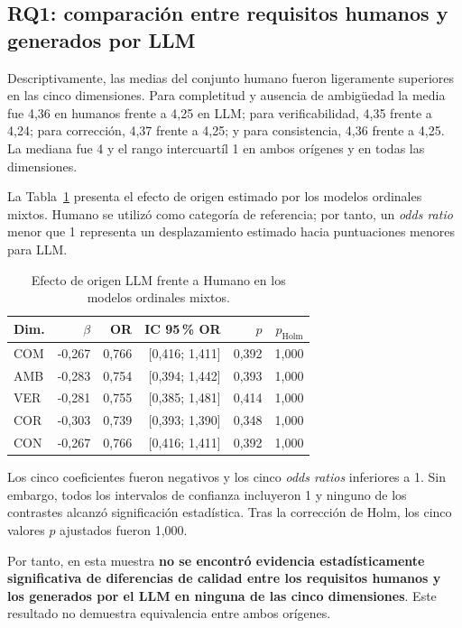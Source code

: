 \documentclass[runningheads]{llncs}
\begin{document}
\subsection{RQ1: comparaci\'on entre requisitos humanos y generados por LLM}

Descriptivamente, las medias del conjunto humano fueron ligeramente superiores en
las cinco dimensiones. Para completitud y ausencia de ambig\"uedad la media fue
4,36 en humanos frente a 4,25 en LLM; para verificabilidad, 4,35 frente a 4,24;
para correcci\'on, 4,37 frente a 4,25; y para consistencia, 4,36 frente a 4,25.
La mediana fue 4 y el rango intercuart\'il 1 en ambos or\'igenes y en todas las
dimensiones.

La Tabla~\ref{tab:rq1} presenta el efecto de origen estimado por los modelos
ordinales mixtos. Humano se utiliz\'o como categor\'ia de referencia; por tanto,
un \emph{odds ratio} menor que 1 representa un desplazamiento estimado hacia
puntuaciones menores para LLM.

\begin{table}[ht]
\centering
\caption{Efecto de origen LLM frente a Humano en los modelos ordinales mixtos.}
\label{tab:rq1}
\small
\begin{tabular}{lrrrrr}
\hline
Dim. & $\beta$ & OR & IC 95\,\% OR & $p$ & $p_{\mathrm{Holm}}$ \\
\hline
COM & -0,267 & 0,766 & [0,416; 1,411] & 0,392 & 1,000 \\
AMB & -0,283 & 0,754 & [0,394; 1,442] & 0,393 & 1,000 \\
VER & -0,281 & 0,755 & [0,385; 1,481] & 0,414 & 1,000 \\
COR & -0,303 & 0,739 & [0,393; 1,390] & 0,348 & 1,000 \\
CON & -0,267 & 0,766 & [0,416; 1,411] & 0,392 & 1,000 \\
\hline
\end{tabular}
\end{table}

Los cinco coeficientes fueron negativos y los cinco \emph{odds ratios} inferiores
a 1. Sin embargo, todos los intervalos de confianza incluyeron 1 y ninguno de los
contrastes alcanz\'o significaci\'on estad\'istica. Tras la correcci\'on de Holm,
los cinco valores $p$ ajustados fueron 1,000.

Por tanto, en esta muestra \textbf{no se encontr\'o evidencia estad\'isticamente
significativa de diferencias de calidad entre los requisitos humanos y los
generados por el LLM en ninguna de las cinco dimensiones}. Este resultado no
demuestra equivalencia entre ambos or\'igenes.
\end{document}
